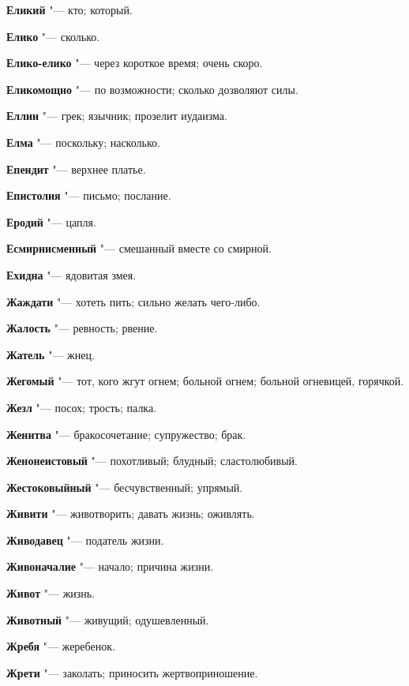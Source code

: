 \begin{mymulticols}
\noindent\textbf{Еликий} "--- кто; который. 

\noindent\textbf{Елико} "--- сколько. 

\noindent\textbf{Елико-елико} "--- через короткое время; очень скоро. 

\noindent\textbf{Еликомощно} "--- по возможности; сколько дозволяют силы. 

\noindent\textbf{Еллин} "--- грек; язычник; прозелит иудаизма. 

\noindent\textbf{Елма} "--- поскольку; насколько. 

\noindent\textbf{Епендит} "--- верхнее платье. 

\noindent\textbf{Епистолия} "--- письмо; послание. 

\noindent\textbf{Еродий} "--- цапля. 

\noindent\textbf{Есмирнисменный} "--- смешанный вместе со смирной. 

\noindent\textbf{Ехидна} "--- ядовитая змея. 

\bukvaending


\noindent\textbf{Жаждати} "--- хотеть пить; сильно желать чего-либо. 

\noindent\textbf{Жалость} "--- ревность; рвение. 

\noindent\textbf{Жатель} "--- жнец. 

\noindent\textbf{Жегомый} "--- тот, кого жгут огнем; больной огнем; больной огневицей, горячкой. 

\noindent\textbf{Жезл} "--- посох; трость; палка. 

\noindent\textbf{Женитва} "--- бракосочетание; супружество; брак. 

\noindent\textbf{Женонеистовый} "--- похотливый; блудный; сластолюбивый. 

\noindent\textbf{Жестоковыйный} "--- бесчувственный; упрямый. 

\noindent\textbf{Живити} "--- животворить; давать жизнь; оживлять. 

\noindent\textbf{Живодавец} "--- податель жизни. 

\noindent\textbf{Живоначалие} "--- начало; причина жизни. 

\noindent\textbf{Живот} "--- жизнь. 

\noindent\textbf{Животный} "--- живущий; одушевленный. 

\noindent\textbf{Жребя} "--- жеребенок. 

\noindent\textbf{Жрети} "--- заколать; приносить жертвоприношение. 


\end{mymulticols}
